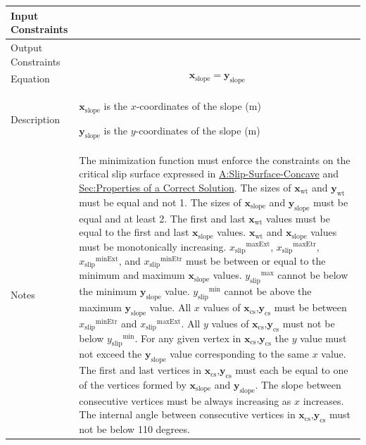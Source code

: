 \documentclass[12pt]{article}
\begin{document}
\begin{minipage}{\textwidth}
\begin{tabular}{>{\raggedright}p{}>{\raggedright\arraybackslash}p{}}
\\ \midrule
Input Constraints & 
\\ \midrule
Output Constraints & 
\\ \midrule
Equation & \begin{displaymath}
           {\symbf{x}_{\text{slope}}}={\symbf{y}_{\text{slope}}}
           \end{displaymath}
\\ \midrule
Description & \begin{symbDescription}
              \item{${\symbf{x}_{\text{slope}}}$ is the $x$-coordinates of the slope (${\text{m}}$)}
              \item{${\symbf{y}_{\text{slope}}}$ is the $y$-coordinates of the slope (${\text{m}}$)}
              \end{symbDescription}
\\ \midrule
Notes & The minimization function must enforce the constraints on the critical slip surface expressed in \hyperref[assumpSSC]{A:Slip-Surface-Concave} and \hyperref[Sec:CorSolProps]{Sec:Properties of a Correct Solution}. The sizes of ${\symbf{x}_{\text{wt}}}$ and ${\symbf{y}_{\text{wt}}}$ must be equal and not 1. The sizes of ${\symbf{x}_{\text{slope}}}$ and ${\symbf{y}_{\text{slope}}}$ must be equal and at least 2. The first and last ${\symbf{x}_{\text{wt}}}$ values must be equal to the first and last ${\symbf{x}_{\text{slope}}}$ values. ${\symbf{x}_{\text{wt}}}$ and ${\symbf{x}_{\text{slope}}}$ values must be monotonically increasing. ${{x_{\text{slip}}}^{\text{maxExt}}}$, ${{x_{\text{slip}}}^{\text{maxEtr}}}$, ${{x_{\text{slip}}}^{\text{minExt}}}$, and ${{x_{\text{slip}}}^{\text{minEtr}}}$ must be between or equal to the minimum and maximum ${\symbf{x}_{\text{slope}}}$ values. ${{y_{\text{slip}}}^{\text{max}}}$ cannot be below the minimum ${\symbf{y}_{\text{slope}}}$ value. ${{y_{\text{slip}}}^{\text{min}}}$ cannot be above the maximum ${\symbf{y}_{\text{slope}}}$ value. All $x$ values of ${\symbf{x}_{\text{cs}}}\text{,}{\symbf{y}_{\text{cs}}}$ must be between ${{x_{\text{slip}}}^{\text{minEtr}}}$ and ${{x_{\text{slip}}}^{\text{maxExt}}}$. All $y$ values of ${\symbf{x}_{\text{cs}}}\text{,}{\symbf{y}_{\text{cs}}}$ must not be below ${{y_{\text{slip}}}^{\text{min}}}$. For any given vertex in ${\symbf{x}_{\text{cs}}}\text{,}{\symbf{y}_{\text{cs}}}$ the $y$ value must not exceed the ${\symbf{y}_{\text{slope}}}$ value corresponding to the same $x$ value. The first and last vertices in ${\symbf{x}_{\text{cs}}}\text{,}{\symbf{y}_{\text{cs}}}$ must each be equal to one of the vertices formed by ${\symbf{x}_{\text{slope}}}$ and ${\symbf{y}_{\text{slope}}}$. The slope between consecutive vertices must be always increasing as $x$ increases. The internal angle between consecutive vertices in ${\symbf{x}_{\text{cs}}}\text{,}{\symbf{y}_{\text{cs}}}$ must not be below 110 degrees.
        

\end{tabular}
\end{minipage}
\end{document}
